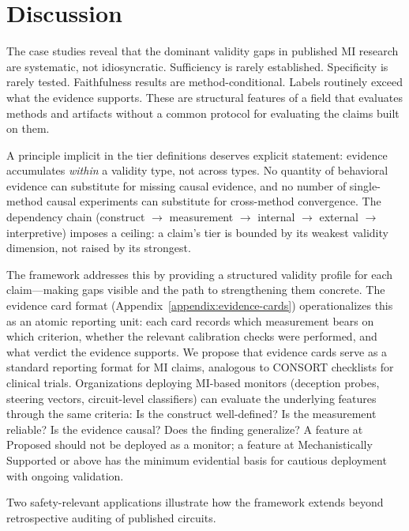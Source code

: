 \documentclass{article}
\begin{document}
\section{Discussion}
\label{sec:discussion}

The case studies reveal that the dominant validity gaps in published MI research are systematic, not idiosyncratic. Sufficiency is rarely established. Specificity is rarely tested. Faithfulness results are method-conditional. Labels routinely exceed what the evidence supports. These are structural features of a field that evaluates methods and artifacts without a common protocol for evaluating the claims built on them.

A principle implicit in the tier definitions deserves explicit statement: evidence accumulates \emph{within} a validity type, not across types.  No quantity of behavioral evidence can substitute for missing causal evidence, and no number of single-method causal experiments can substitute for cross-method convergence.  The dependency chain (construct $\to$ measurement $\to$ internal $\to$ external $\to$ interpretive) imposes a ceiling: a claim's tier is bounded by its weakest validity dimension, not raised by its strongest.

The framework addresses this by providing a structured validity profile for each claim---making gaps visible and the path to strengthening them concrete. The evidence card format (Appendix~\ref{appendix:evidence-cards}) operationalizes this as an atomic reporting unit: each card records which measurement bears on which criterion, whether the relevant calibration checks were performed, and what verdict the evidence supports. We propose that evidence cards serve as a standard reporting format for MI claims, analogous to CONSORT checklists for clinical trials. Organizations deploying MI-based monitors (deception probes, steering vectors, circuit-level classifiers) can evaluate the underlying features through the same criteria: Is the construct well-defined? Is the measurement reliable? Is the evidence causal? Does the finding generalize? A feature at Proposed should not be deployed as a monitor; a feature at Mechanistically Supported or above has the minimum evidential basis for cautious deployment with ongoing validation.

Two safety-relevant applications illustrate how the framework extends beyond retrospective auditing of published circuits.
\end{document}
